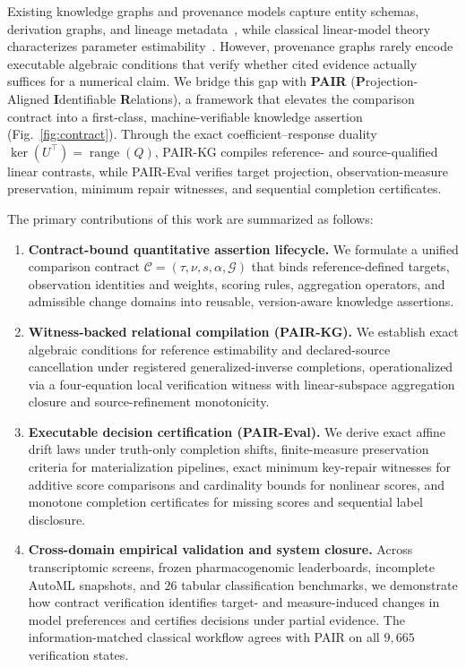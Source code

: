 \documentclass[preprint,12pt,number,sort&compress]{elsarticle}
\newcommand{\method}{PAIR\xspace}
\newcommand{\pairkg}{PAIR-KG\xspace}
\newcommand{\paireval}{PAIR-Eval\xspace}
\begin{document}
Existing knowledge graphs and provenance models capture entity schemas, derivation graphs, and lineage metadata~\cite{hogan2021knowledge,unni2022biolink,green2007provenance,w3c2013prov,sen2026provsql}, while classical linear-model theory characterizes parameter estimability~\cite{searle1971linear,rao1971generalized}. However, provenance graphs rarely encode executable algebraic conditions that verify whether cited evidence actually suffices for a numerical claim. We bridge this gap with \textbf{\method} (\textbf{P}rojection-Aligned \textbf{I}dentifiable \textbf{R}elations), a framework that elevates the comparison contract into a first-class, machine-verifiable knowledge assertion (Fig.~\ref{fig:contract}). Through the exact coefficient--response duality $\ker(U^\top)=\operatorname{range}(Q)$, \pairkg compiles reference- and source-qualified linear contrasts, while \paireval verifies target projection, observation-measure preservation, minimum repair witnesses, and sequential completion certificates.

The primary contributions of this work are summarized as follows:
\begin{enumerate}
\item \textbf{Contract-bound quantitative assertion lifecycle.} We formulate a unified comparison contract $\mathcal{C}=(\tau,\nu,s,\alpha,\mathcal{G})$ that binds reference-defined targets, observation identities and weights, scoring rules, aggregation operators, and admissible change domains into reusable, version-aware knowledge assertions.
\item \textbf{Witness-backed relational compilation (\pairkg).} We establish exact algebraic conditions for reference estimability and declared-source cancellation under registered generalized-inverse completions, operationalized via a four-equation local verification witness with linear-subspace aggregation closure and source-refinement monotonicity.
\item \textbf{Executable decision certification (\paireval).} We derive exact affine drift laws under truth-only completion shifts, finite-measure preservation criteria for materialization pipelines, exact minimum key-repair witnesses for additive score comparisons and cardinality bounds for nonlinear scores, and monotone completion certificates for missing scores and sequential label disclosure.
\item \textbf{Cross-domain empirical validation and system closure.} Across transcriptomic screens, frozen pharmacogenomic leaderboards, incomplete AutoML snapshots, and $26$ tabular classification benchmarks, we demonstrate how contract verification identifies target- and measure-induced changes in model preferences and certifies decisions under partial evidence. The information-matched classical workflow agrees with PAIR on all $9{,}665$ verification states.
\end{enumerate}
\end{document}
